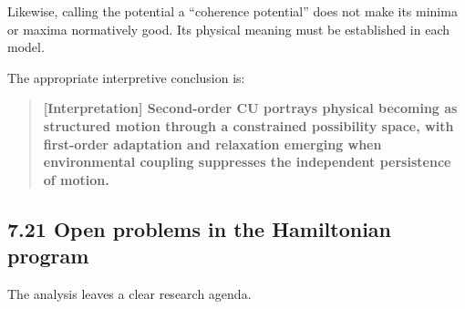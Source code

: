 \documentclass[
  11pt,
]{article}
\begin{document}
Likewise, calling the potential a ``coherence potential'' does not make
its minima or maxima normatively good. Its physical meaning must be
established in each model.

The appropriate interpretive conclusion is:

\begin{quote}
\textbf{{[}Interpretation{]} Second-order CU portrays physical becoming
as structured motion through a constrained possibility space, with
first-order adaptation and relaxation emerging when environmental
coupling suppresses the independent persistence of motion.}
\end{quote}

\subsection{7.21 Open problems in the Hamiltonian
program}\label{open-problems-in-the-hamiltonian-program}

The analysis leaves a clear research agenda.
\end{document}
